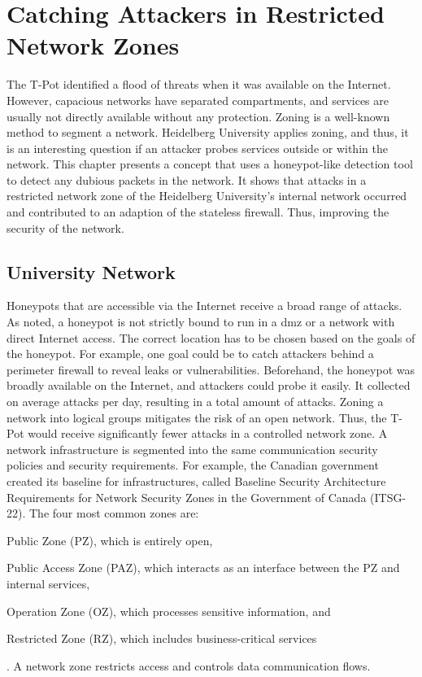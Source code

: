 \chapter{Catching Attackers in Restricted Network Zones}
\label{chap:concept}

The T-Pot identified a flood of threats when it was available on the Internet.
However, capacious networks have separated compartments, and services are usually not directly available without any protection.
Zoning is a well-known method to segment a network.
Heidelberg University applies zoning, and thus, it is an interesting question if an attacker probes services outside or within the network.
This chapter presents a concept that uses a honeypot-like detection tool to detect any dubious packets in the network.
It shows that attacks in a restricted network zone of the Heidelberg University's internal network occurred and contributed to an adaption of the stateless firewall.
Thus, improving the security of the network.

\section{University Network}

Honeypots that are accessible via the Internet receive a broad range of attacks.
As \citet{Spitzner2003} noted, a honeypot is not strictly bound to run in a \ac{dmz} or a network with direct Internet access.
The correct location has to be chosen based on the goals of the honeypot.
For example, one goal could be to catch attackers behind a perimeter firewall to reveal leaks or vulnerabilities.
Beforehand, the honeypot was broadly available on the Internet, and attackers could probe it easily.
It collected on average  attacks per day, resulting in a total amount of  attacks.
Zoning a network into logical groups mitigates the risk of an open network.
Thus, the T-Pot would receive significantly fewer attacks in a controlled network zone.
A network infrastructure is segmented into the same communication security policies and security requirements.
For example, the Canadian government created its baseline for infrastructures, called Baseline Security Architecture Requirements for Network Security Zones in the Government of Canada (ITSG-22).
The four most common zones are:
\begin{enumerate*}[label=(\roman*)]
    \item Public Zone (PZ), which is entirely open,
    \item Public Access Zone (PAZ), which interacts as an interface between the PZ and internal services,
    \item Operation Zone (OZ), which processes sensitive information, and
    \item Restricted Zone (RZ), which includes business-critical services
\end{enumerate*}.
A network zone restricts access and controls data communication flows. \cite{csec2021}

